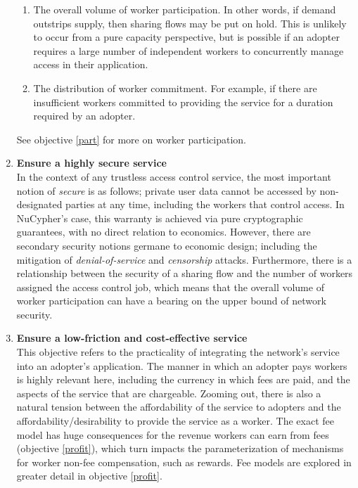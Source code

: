 \documentclass[11pt]{amsart}
\begin{document}
\begin{enumerate}
\begin{enumerate}
   \item The overall volume of worker participation. In other words, if demand outstrips supply, then sharing flows may be put on hold. This is unlikely to occur from a pure capacity perspective, but is possible if an adopter requires a large number of independent workers to concurrently manage access in their application.
   \item The distribution of worker commitment. For example, if there are insufficient workers committed to providing the service for a duration required by an adopter. 
   \end{enumerate}
   See objective \ref{part} for more on worker participation.
   \\
   \item \textbf{Ensure a highly secure service}\label{secure}
   \\
   In the context of any trustless access control service, the most important notion of \textit{secure} is as follows; private user data cannot be accessed by non-designated parties at any time, including the workers that control access. In NuCypher's case, this warranty is achieved via pure cryptographic guarantees, with no direct relation to economics. However, there are secondary security notions germane to economic design; including the mitigation of \textit{denial-of-service} and \textit{censorship} attacks. Furthermore, there is a relationship between the security of a sharing flow and the number of workers assigned the access control job, which means that the overall volume of worker participation can have a bearing on the upper bound of network security.
   \\
   \item \textbf{Ensure a low-friction and cost-effective service}\label{friction}
   \\
   This objective refers to the practicality of integrating the network's service into an adopter's application. The manner in  which an adopter pays workers is highly relevant here, including the currency in which fees are paid, and the aspects of the service that are chargeable. Zooming out, there is also a natural tension between the affordability of the service to adopters and the affordability/desirability to provide the service as a worker. The exact fee model has huge consequences for the revenue workers can earn from fees (objective \ref{profit}), which turn impacts the parameterization of mechanisms for worker non-fee compensation, such as rewards. Fee models are explored in greater detail in objective \ref{profit}.

\end{enumerate}
\end{document}
